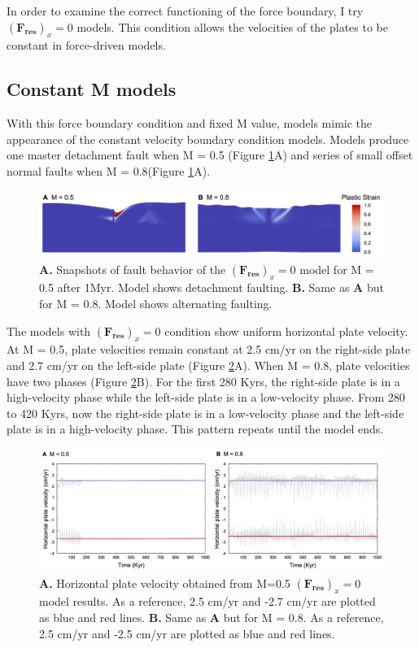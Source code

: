 \documentclass[letterpaper,12pt,notitle]{memphisthesis}                     %
\begin{document}
In order to examine the correct functioning of the force boundary, I try $(\boldsymbol{F_{res}})_x=0$ models. This  condition allows the velocities of the plates to be constant in force-driven models.

\subsection{Constant M models}

With this force boundary condition and fixed M value, models mimic the appearance of the constant velocity boundary condition models. Models produce one master detachment fault when M = 0.5 (Figure \ref{fig:f0fault}A) and series of small offset normal faults when M = 0.8(Figure \ref{fig:f0fault}A).

\begin{figure}[!htb]
	\centering
	\includegraphics[width=0.99\linewidth]{./figs/f0fault.png}
	\caption{\textbf{A.} Snapshots of fault behavior of the $(\boldsymbol{F_{res}})_x=0$ model for M = 0.5 after 1Myr. Model shows detachment faulting. \textbf{B.} Same as \textbf{A} but for M = 0.8. Model shows alternating faulting.}
	\label{fig:f0fault}
\end{figure}

The models with $(\boldsymbol{F_{res}})_x=0$ condition show uniform horizontal plate velocity. At M = 0.5, plate velocities remain constant at 2.5 cm/yr on the right-side plate and 2.7 cm/yr on the left-side plate (Figure \ref{fig:f0vel}A). When M = 0.8, plate velocities have two phases (Figure \ref{fig:f0vel}B). For the first 280 Kyrs, the right-side plate is in a high-velocity phase while the left-side plate is in a low-velocity phase. From 280 to 420 Kyrs, now the right-side plate is in a low-velocity phase and the left-side plate is in a high-velocity phase. This pattern repeats until the model ends.

\begin{figure}[!htb]
	\centering
	\includegraphics[width=0.99\linewidth]{./figs/f0vel.png}
	\caption{\textbf{A.} Horizontal plate velocity obtained from M=0.5 $(\boldsymbol{F_{res}})_x=0$ model results. As a reference, 2.5 cm/yr and -2.7 cm/yr are plotted as blue and red lines. \textbf{B.} Same as \textbf{A} but for M = 0.8. As a reference, 2.5 cm/yr and -2.5 cm/yr are plotted as blue and red lines.}
	\label{fig:f0vel}
\end{figure}
\end{document}
